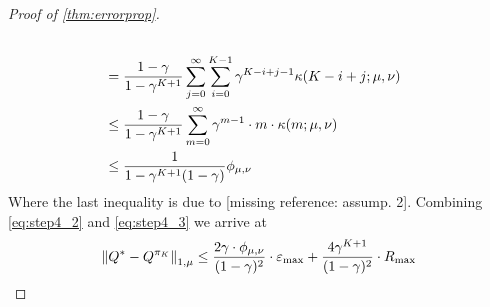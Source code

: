 \begin{proof}[Proof of \cref{thm:errorprop}]
\begin{align}
    \\ &= \frac{1-\gamma}{1-\gamma^{K+1}} \sum_{j=0}^\infty \sum_{i=0}^{K-1} 
    \gamma^{K-i+j-1} \kappa(K-i+j;\mu,\nu) \notag
    \\ &\leq \frac{1-\gamma}{1-\gamma^{K+1}} \sum_{m=0}^\infty
    \gamma^{m-1} \cdot m \cdot \kappa(m; \mu, \nu) \notag
    \\ &\leq \frac{1}{1-\gamma^{K+1}(1-\gamma)} \phi_{\mu,\nu}
    \label{eq:step4_3}
  \end{align}
  Where the last inequality is due to [missing reference: assump. 2].
  Combining \cref{eq:step4_2} and \cref{eq:step4_3} we arrive at
  \begin{equation}
    \norm{Q^* - Q^{\pi_K}}_{1,\mu} \leq
    \frac{2\gamma \cdot \phi_{\mu,\nu}}{(1-\gamma)^2} \cdot \varepsilon_{\max}
    + \frac{4\gamma^{K+1}}{(1-\gamma)^2} \cdot R_{\max}
  \end{equation}
\end{proof}


